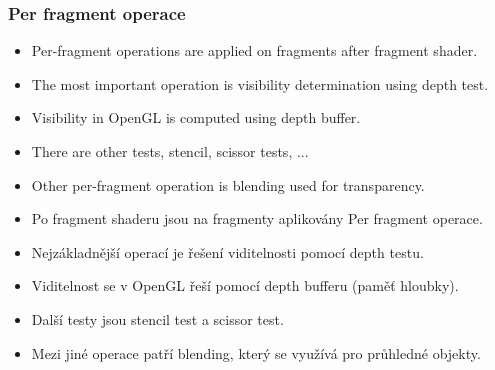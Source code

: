 
\begin{frame}[fragile]\frametitle{Per fragment operace}\scriptsize
  \begin{itemize}
  \item Per-fragment operations are applied on fragments after fragment shader.
  \item The most important operation is visibility determination using depth test.
  \item Visibility in OpenGL is computed using depth buffer.
  \item There are other tests, stencil, scissor tests, ...
  \item Other per-fragment operation is blending used for transparency.
  \end{itemize}
  \begin{itemize}
  \item Po fragment shaderu jsou na fragmenty aplikovány Per fragment operace.
  \item Nejzákladnější operací je řešení viditelnosti pomocí depth testu.
  \item Viditelnost se v OpenGL řeší pomocí depth bufferu (paměť hloubky).
  \item Další testy jsou stencil test a scissor test.
  \item Mezi jiné operace patří blending, který se využívá pro průhledné objekty.
  \end{itemize}
\end{frame}


